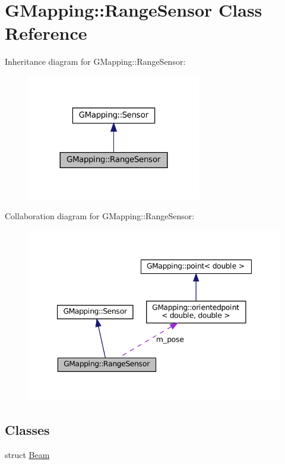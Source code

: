 \hypertarget{classGMapping_1_1RangeSensor}{}\section{G\+Mapping\+:\+:Range\+Sensor Class Reference}
\label{classGMapping_1_1RangeSensor}


Inheritance diagram for G\+Mapping\+:\+:Range\+Sensor\+:
\nopagebreak
\begin{figure}[H]
\begin{center}
\leavevmode
\includegraphics[width=215pt]{classGMapping_1_1RangeSensor__inherit__graph}
\end{center}
\end{figure}


Collaboration diagram for G\+Mapping\+:\+:Range\+Sensor\+:
\nopagebreak
\begin{figure}[H]
\begin{center}
\leavevmode
\includegraphics[width=347pt]{classGMapping_1_1RangeSensor__coll__graph}
\end{center}
\end{figure}
\subsection*{Classes}
\begin{DoxyCompactItemize}
\item 
struct \hyperlink{structGMapping_1_1RangeSensor_1_1Beam}{Beam}
\end{DoxyCompactItemize}
